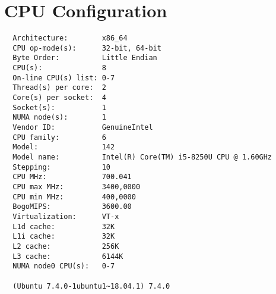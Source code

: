 \section{CPU Configuration}
\begin{verbatim}
  Architecture:        x86_64
  CPU op-mode(s):      32-bit, 64-bit
  Byte Order:          Little Endian
  CPU(s):              8
  On-line CPU(s) list: 0-7
  Thread(s) per core:  2
  Core(s) per socket:  4
  Socket(s):           1
  NUMA node(s):        1
  Vendor ID:           GenuineIntel
  CPU family:          6
  Model:               142
  Model name:          Intel(R) Core(TM) i5-8250U CPU @ 1.60GHz
  Stepping:            10
  CPU MHz:             700.041
  CPU max MHz:         3400,0000
  CPU min MHz:         400,0000
  BogoMIPS:            3600.00
  Virtualization:      VT-x
  L1d cache:           32K
  L1i cache:           32K
  L2 cache:            256K
  L3 cache:            6144K
  NUMA node0 CPU(s):   0-7

  (Ubuntu 7.4.0-1ubuntu1~18.04.1) 7.4.0

\end{verbatim}
\newpage
